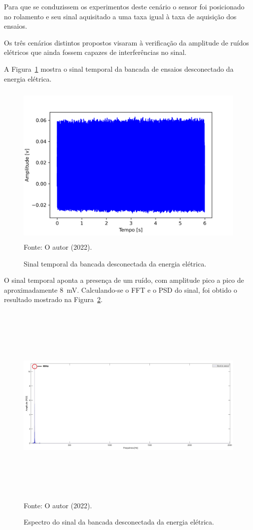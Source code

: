 \documentclass[
	12pt,				
	oneside,			
	a4paper,			
	english,			
	brazil,			
	]{abntex2ppgsi}
\begin{document}
Para que se conduzissem os experimentos deste cenário o sensor foi posicionado no rolamento e seu sinal aquisitado a uma taxa igual à taxa de aquisição dos ensaios. 

Os três cenários distintos propostos visaram à verificação da amplitude de ruídos elétricos que ainda fossem capazes de interferências no sinal. 

A Figura~\ref{maquina_desligada_da_tomada} mostra o sinal temporal da bancada de ensaios desconectado da energia elétrica. 

\begin{figure}[H]
\centering
\caption {Sinal temporal da bancada desconectada da energia elétrica.}
\includegraphics[width=\textwidth,height=80mm,keepaspectratio]{Caso0/maquina_desligada_da_tomada} \\
Fonte: O autor (2022).
\label{maquina_desligada_da_tomada}
\end{figure} 

O sinal temporal aponta a presença de um ruído, com amplitude pico a pico de aproximadamente {\SI{8}{\milli\volt}}. Calculando-se o FFT e o PSD do sinal, foi obtido o resultado mostrado na Figura~\ref{PSD_SENSOR_MAQUINA_DESLIGADA}. 

\begin{figure}[H]
\centering
\caption {Espectro do sinal da bancada desconectada da energia elétrica.}
\includegraphics[width=\textwidth,height=100mm,keepaspectratio]{Caso0/PSD_SENSOR_MAQUINA_DESLIGADA} \\
Fonte: O autor (2022).
\label{PSD_SENSOR_MAQUINA_DESLIGADA}
\end{figure} 
\end{document}
